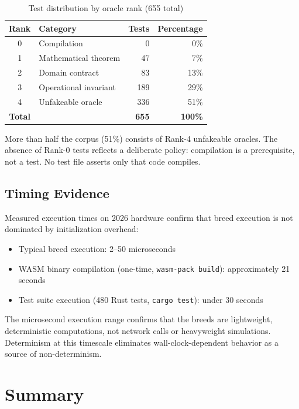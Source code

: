 \begin{table}[h]
\centering
\caption{Test distribution by oracle rank (655 total)}
\label{tab:rank-distribution}
\begin{tabular}{clrr}
\hline
\textbf{Rank} & \textbf{Category} & \textbf{Tests} & \textbf{Percentage} \\
\hline
0 & Compilation          &   0 &  0\% \\
1 & Mathematical theorem &  47 &  7\% \\
2 & Domain contract      &  83 & 13\% \\
3 & Operational invariant & 189 & 29\% \\
4 & Unfakeable oracle    & 336 & 51\% \\
\hline
\textbf{Total} & & \textbf{655} & \textbf{100\%} \\
\hline
\end{tabular}
\end{table}

\noindent More than half the corpus (51\%) consists of Rank-4 unfakeable oracles. The absence
of Rank-0 tests reflects a deliberate policy: compilation is a prerequisite, not a test. No
test file asserts only that code compiles.

\subsection{Timing Evidence}

Measured execution times on 2026 hardware confirm that breed execution is not dominated by
initialization overhead:

\begin{itemize}
  \item Typical breed execution: 2--50 microseconds
  \item WASM binary compilation (one-time, \texttt{wasm-pack build}): approximately 21 seconds
  \item Test suite execution (480 Rust tests, \texttt{cargo test}): under 30 seconds
\end{itemize}

The microsecond execution range confirms that the breeds are lightweight, deterministic
computations, not network calls or heavyweight simulations. Determinism at this timescale
eliminates wall-clock-dependent behavior as a source of non-determinism.

\section{Summary}
\label{sec:falsification-summary}

